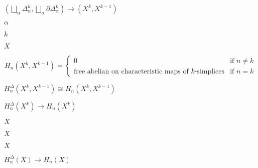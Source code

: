 \documentclass[10pt]{book}
\begin{document}
\begin{mdSnippets}
\begin{mdDisplaySnippet}
\[\]%
\end{mdDisplaySnippet}%
\begin{mdInlineSnippet}%
$(\bigsqcup_\alpha \Delta_\alpha^k, \bigsqcup_\alpha \partial \Delta_\alpha^k) \to (X^k, X^{k-1})$\end{mdInlineSnippet}%
\begin{mdInlineSnippet}[7b7f9dbfea05c83784f8b85149852f08]%
$\alpha$\end{mdInlineSnippet}%
\begin{mdInlineSnippet}[8ce4b16b22b58894aa86c421e8759df3]%
$k$\end{mdInlineSnippet}%
\begin{mdInlineSnippet}[02129bb861061d1a052c592e2dc6b383]%
$X$\end{mdInlineSnippet}%
\begin{mdDisplaySnippet}[70f244a7b2142e7d91b23515629e9196]%
\[%
H_n(X^k, X^{k-1}) = \begin{cases}
  0 & \text{if } n \ne k \\
  \text{free abelian on characteristic maps of $k$-simplices} & \text{if } n = k
\end{cases}
\]%
\end{mdDisplaySnippet}%
\begin{mdInlineSnippet}[d0882bee42218a34e658f6ae80d56668]%
$H_n^\Delta(X^k, X^{k-1}) \cong H_n(X^k, X^{k-1})$\end{mdInlineSnippet}%
\begin{mdInlineSnippet}%
$H_n^\Delta(X^k) \to H_n(X^k)$\end{mdInlineSnippet}%
\begin{mdInlineSnippet}[02129bb861061d1a052c592e2dc6b383]%
$X$\end{mdInlineSnippet}%
\begin{mdInlineSnippet}[02129bb861061d1a052c592e2dc6b383]%
$X$\end{mdInlineSnippet}%
\begin{mdInlineSnippet}[02129bb861061d1a052c592e2dc6b383]%
$X$\end{mdInlineSnippet}%
\begin{mdInlineSnippet}%
$H_n^\Delta(X) \to H_n(X)$\end{mdInlineSnippet}%

\end{mdSnippets}
\end{document}
